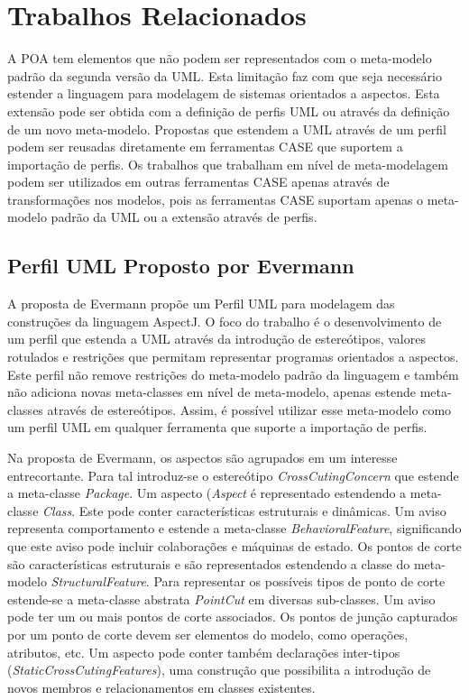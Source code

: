 \chapter{Trabalhos Relacionados}
\label{sec:trabalhos_relacionados}

A POA tem elementos que não podem ser representados com o meta-modelo padrão da segunda versão da UML. Esta limitação faz com que seja necessário
estender a linguagem para modelagem de sistemas orientados a aspectos. Esta extensão pode ser obtida com a definição de perfis UML ou através da
definição de um novo meta-modelo. Propostas que estendem a UML através de um perfil podem ser reusadas diretamente em ferramentas CASE que suportem a
importação de perfis. Os trabalhos que trabalham em nível de meta-modelagem podem ser utilizados em outras ferramentas CASE apenas através de
transformações nos modelos, pois as ferramentas CASE suportam apenas o meta-modelo padrão da UML ou a extensão através de perfis. 

\section{Perfil UML Proposto por Evermann}

A proposta de Evermann \cite{Evermann:2007:MSP:1229375.1229379} propõe um Perfil UML para modelagem das construções da linguagem AspectJ. O foco do
trabalho é o desenvolvimento de um perfil que estenda a UML através da introdução de estereótipos, valores rotulados e restrições que permitam representar 
programas orientados a aspectos. Este perfil não remove restrições do meta-modelo padrão da linguagem e também não adiciona novas meta-classes em nível de
meta-modelo, apenas estende meta-classes através de estereótipos. Assim, é possível utilizar esse meta-modelo como um perfil UML em qualquer ferramenta que 
suporte a importação de perfis.

Na proposta de Evermann, os aspectos são agrupados em um interesse entrecortante. Para tal introduz-se o estereótipo \textit{CrossCutingConcern} que
estende a meta-classe \textit{Package}. Um aspecto (\textit{Aspect} é representado estendendo a meta-classe \textit{Class}. Este pode conter características
estruturais e dinâmicas. Um aviso representa comportamento e estende a meta-classe \textit{BehavioralFeature}, significando que este aviso pode
incluir colaborações e máquinas de estado. Os pontos de corte são características estruturais e são representados estendendo a classe do meta-modelo
\textit{StructuralFeature}. Para representar os possíveis tipos de ponto de corte estende-se a meta-classe abstrata \textit{PointCut} em diversas
sub-classes. Um aviso pode ter um ou mais pontos de corte associados. Os pontos de junção capturados por um ponto de corte devem ser elementos do
modelo, como operações, atributos, etc. Um aspecto pode conter também declarações inter-tipos (\textit{StaticCrossCutingFeatures}), uma construção que
possibilita a introdução de novos membros e relacionamentos em classes existentes. 

